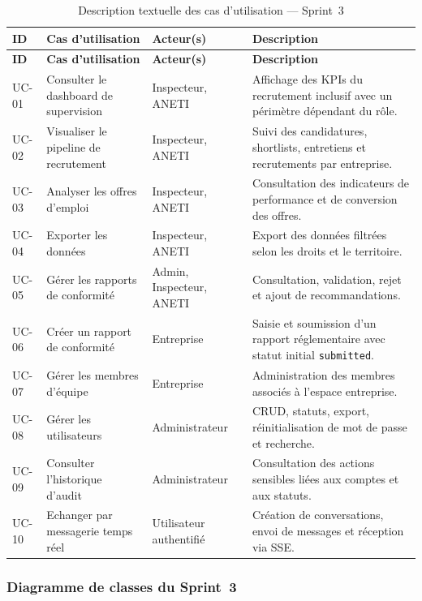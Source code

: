 \documentclass[12pt,a4paper]{report}
\begin{document}
\small
\setlength{\tabcolsep}{4pt}
\renewcommand{\arraystretch}{1.15}
\begin{longtable}{|L{1.3cm}|L{3.9cm}|L{3.1cm}|L{6.1cm}|}
\caption{Description textuelle des cas d'utilisation — Sprint~3}
\label{tab:s3_uc_description}\\
\hline
{}
\textbf{ID} & \textbf{Cas d'utilisation} & \textbf{Acteur(s)} & \textbf{Description} \\
\hline
\endfirsthead
\hline
{}
\textbf{ID} & \textbf{Cas d'utilisation} & \textbf{Acteur(s)} & \textbf{Description} \\
\hline
\endhead
UC-01 & Consulter le dashboard de supervision & Inspecteur, ANETI & Affichage des KPIs du recrutement inclusif avec un périmètre dépendant du rôle. \\
\hline
UC-02 & Visualiser le pipeline de recrutement & Inspecteur, ANETI & Suivi des candidatures, shortlists, entretiens et recrutements par entreprise. \\
\hline
UC-03 & Analyser les offres d'emploi & Inspecteur, ANETI & Consultation des indicateurs de performance et de conversion des offres. \\
\hline
UC-04 & Exporter les données & Inspecteur, ANETI & Export des données filtrées selon les droits et le territoire. \\
\hline
UC-05 & Gérer les rapports de conformité & Admin, Inspecteur, ANETI & Consultation, validation, rejet et ajout de recommandations. \\
\hline
UC-06 & Créer un rapport de conformité & Entreprise & Saisie et soumission d'un rapport réglementaire avec statut initial \texttt{submitted}. \\
\hline
UC-07 & Gérer les membres d'équipe & Entreprise & Administration des membres associés à l'espace entreprise. \\
\hline
UC-08 & Gérer les utilisateurs & Administrateur & CRUD, statuts, export, réinitialisation de mot de passe et recherche. \\
\hline
UC-09 & Consulter l'historique d'audit & Administrateur & Consultation des actions sensibles liées aux comptes et aux statuts. \\
\hline
UC-10 & Echanger par messagerie temps réel & Utilisateur authentifié & Création de conversations, envoi de messages et réception via SSE. \\
\hline
\end{longtable}
\normalsize

\subsubsection{Diagramme de classes du Sprint~3}
\end{document}
